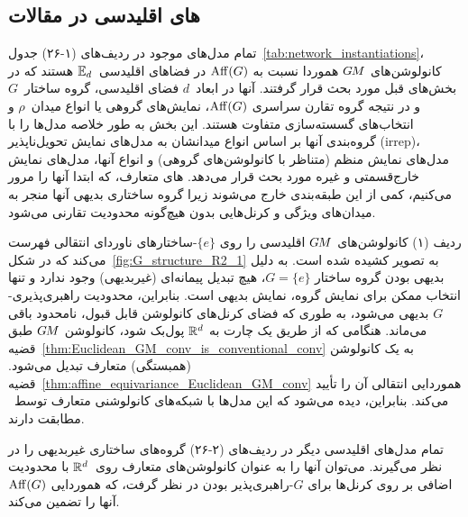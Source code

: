 

\subsection{های اقلیدسی در مقالات}
\label{sec:euclidean_literature}

تمام مدل‌های موجود در ردیف‌های (۱-۲۶) جدول~\ref{tab:network_instantiations}، کانولوشن‌های $G\mkern-1.4muM$ هموردا نسبت به $\operatorname{Aff}(G)$ در فضاهای اقلیدسی~$\mathbb{E}_d$ هستند که در بخش‌های قبل مورد بحث قرار گرفتند.
آنها در ابعاد~$d$ فضای اقلیدسی، گروه ساختار~$G$ و در نتیجه گروه تقارن سراسری $\operatorname{Aff}(G)$، نمایش‌های گروهی یا انواع میدان~$\rho$ و انتخاب‌های گسسته‌سازی متفاوت هستند.
این بخش به طور خلاصه مدل‌ها را با گروه‌بندی آنها بر اساس انواع میدانشان به مدل‌های نمایش تحویل‌ناپذیر (irrep)، مدل‌های نمایش منظم (متناظر با کانولوشن‌های گروهی) و انواع آنها، مدل‌های نمایش خارج‌قسمتی و غیره مورد بحث قرار می‌دهد.
های متعارف، که ابتدا آنها را مرور می‌کنیم، کمی از این طبقه‌بندی خارج می‌شوند زیرا گروه ساختاری بدیهی آنها منجر به میدان‌های ویژگی و کرنل‌هایی بدون هیچ‌گونه محدودیت تقارنی می‌شود.


ردیف (۱) کانولوشن‌های $G\mkern-1.4muM$ اقلیدسی را روی $\{e\}$-ساختارهای ناوردای انتقالی فهرست می‌کند که در شکل~\ref{fig:G_structure_R2_1} به تصویر کشیده شده است.
به دلیل بدیهی بودن گروه ساختار $G=\{e\}$، هیچ تبدیل پیمانه‌ای (غیربدیهی) وجود ندارد و تنها انتخاب ممکن برای نمایش گروه، نمایش بدیهی است.
بنابراین، محدودیت راهبری‌پذیری-$G$ بدیهی می‌شود، به طوری که فضای کرنل‌های کانولوشن قابل قبول، نامحدود باقی می‌ماند.
هنگامی که از طریق یک چارت به $\mathbb{R}^d$ پول‌بک شود، کانولوشن $G\mkern-1.4muM$ طبق قضیه~\ref{thm:Euclidean_GM_conv_is_conventional_conv} به یک کانولوشن (همبستگی) متعارف تبدیل می‌شود.
قضیه~\ref{thm:affine_equivariance_Euclidean_GM_conv} هموردایی انتقالی آن را تأیید می‌کند.
بنابراین، دیده می‌شود که این مدل‌ها با شبکه‌های کانولوشنی متعارف توسط~\citet{LeCun1990CNNs} مطابقت دارند.


تمام مدل‌های اقلیدسی دیگر در ردیف‌های (۲-۲۶) گروه‌های ساختاری غیربدیهی را در نظر می‌گیرند.
می‌توان آنها را به عنوان کانولوشن‌های متعارف روی~$\mathbb{R}^d$ با محدودیت اضافی بر روی کرنل‌ها برای $G$-راهبری‌پذیر بودن در نظر گرفت، که هموردایی $\operatorname{Aff}(G)$ آنها را تضمین می‌کند.


